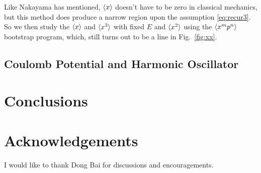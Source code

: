 \documentclass[aps,prl, preprint,amsmath, amssymb]{revtex4-2}
\begin{document}
Like Nakayama has mentioned, $\braket{x}$ doesn't have to be zero in classical mechanics, but this method does produce a narrow region upon the assumption \eqref{eq:recur3}. So we then study the $\braket{x}$ and $\braket{x^3}$ with fixed $E$ and $\braket{x^2}$ using the $\braket{x^m p^n}$ bootstrap program, which, still turns out to be a line in Fig.~\ref{fig:xx}.

\subsection{Coulomb Potential and Harmonic Oscillator}


\section{Conclusions}

\section*{Acknowledgements}
I would like to thank Dong Bai for discussions and encouragements.



%


\end{document}

